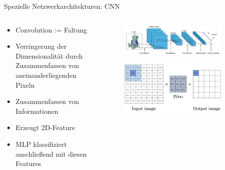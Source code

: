 \documentclass[aspectratio=1610, xcolor=dvipsnames, 9pt]{beamer}
\begin{document}
      \begin{frame}{Spezielle Netzwerkarchitekturen: CNN}
        \begin{columns}
          \begin{column}{0.6\textwidth}
            \begin{itemize}
              \item Convolution := Faltung \newline 
              \item Verringerung der Dimensionalität durch Zusammenfassen von aneinanderliegenden Pixeln \newline 
              \item Zusammenfassen von Informationen \newline 
              \item Erzeugt 2D-Feature \newline 
              \item MLP klassifiziert anschließend mit diesen Features \newline
            \end{itemize}
          \end{column}
           \begin{column}{0.4\textwidth}
             \begin{figure}
               \centering
                           \includegraphics[width=0.9\textwidth]{images/CNN.png}
               \end{figure}
               \begin{figure}
                \centering
                            \includegraphics[width=0.9\textwidth]{images/convolution.png}
                \end{figure}
           \end{column}
        \end{columns}
      \end{frame}
\end{document}
